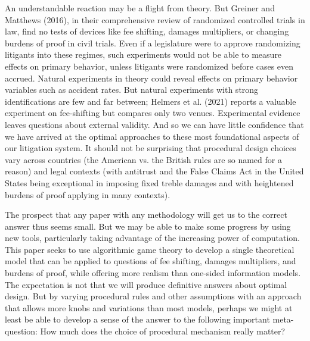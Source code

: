 \documentclass{article}
\begin{document}
An understandable reaction may be a flight from theory. But Greiner and Matthews (2016), in their comprehensive review of randomized controlled trials in law, find no tests of devices like fee shifting, damages multipliers, or changing burdens of proof in civil trials. Even if a legislature were to approve randomizing litigants into these regimes, such experiments would not be able to measure effects on primary behavior, unless litigants were randomized before cases even accrued. Natural experiments in theory could reveal effects on primary behavior variables such as accident rates. But natural experiments with strong identifications are few and far between; Helmers et al. (2021) reports a valuable experiment on fee-shifting but compares only two venues. Experimental evidence leaves questions about external validity. And so we can have little confidence that we have arrived at the optimal approaches to these most foundational aspects of our litigation system. It should not be surprising that procedural design choices vary across countries (the American vs. the British rules are so named for a reason) and legal contexts (with antitrust and the False Claims Act in the United States being exceptional in imposing fixed treble damages and with heightened burdens of proof applying in many contexts).

The prospect that any paper with any methodology will get us to the correct answer thus seems small. But we may be able to make some progress by using new tools, particularly taking advantage of the increasing power of computation. This paper seeks to use algorithmic game theory to develop a single theoretical model that can be applied to questions of fee shifting, damages multipliers, and burdens of proof, while offering more realism than one-sided information models. The expectation is not that we will produce definitive answers about optimal design. But by varying procedural rules and other assumptions with an approach that allows more knobs and variations than most models, perhaps we might at least be able to develop a sense of the answer to the following important meta-question: How much does the choice of procedural mechanism really matter? 
\end{document}
